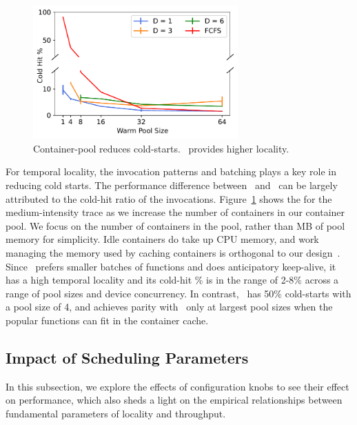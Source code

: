 \begin{figure}
  \centering  \includegraphics[width=0.7\textwidth]{./mqfq-final/graphs/container_pool/big-60min/65/cold_hits.pdf}
  \caption{Container-pool reduces cold-starts. \QName~provides higher locality.}
  \label{fig:caching}
\end{figure}

For temporal locality, the invocation patterns and batching plays a key role in reducing cold starts.
The performance difference between \QName~and \fcfs~can be largely attributed to the cold-hit ratio of the invocations.
Figure~\ref{fig:caching} shows the  for the medium-intensity trace as we increase the number of containers in our container pool.
We focus on the number of containers in the pool, rather than MB of pool memory for simplicity.
Idle containers do take up CPU memory, and work managing the memory used by caching containers is orthogonal to our design~\cite{faascache-asplos21}.
Since \QName~prefers smaller batches of functions and does anticipatory keep-alive, it has a high temporal locality and its cold-hit \% is in the range of 2-8\% across a range of pool sizes and device concurrency.
In contrast, \fcfs~has 50\% cold-starts with a pool size of 4, and achieves parity with \QName~only at largest pool sizes when the popular functions can fit in the container cache.


\subsection{Impact of Scheduling Parameters}
\label{sec:queue-knobs}

In this subsection, we explore the effects of configuration knobs to see their effect on performance, which also sheds a light on the empirical relationships between fundamental parameters of locality and throughput. 


